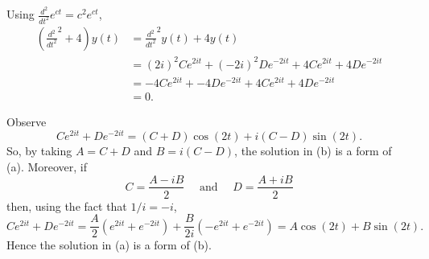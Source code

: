 \documentclass{homework}
\begin{document}

Using $\frac{d^2}{dt^2} e^{ct} = c^2e^{ct}$,
\begin{align*}
  \left(\frac {d^2}{dt^2}^2 + 4\right)y(t) 
  &= \frac {d^2}{dt^2}^2 y(t) + 4y(t)\\
  &= (2i)^2 C e^{2it} + (-2i)^2 De^{-2it} + 4C e^{2it} + 4De^{-2it} \\
  &= -4C e^{2it} + -4De^{-2it} + 4C e^{2it} + 4De^{-2it} \\
  &=0.
\end{align*}

Observe
$$
  Ce^{2it} + De^{-2it} = (C+D)\cos(2t) + i(C-D)\sin(2t).
$$
So, by taking $A = C+D$ and $B = i(C-D)$, the solution in (b) is a form of (a).  Moreover, if 
$$
  C = \frac{A-iB}{2}\quad \text{ and }\quad D = \frac{A + iB}{2} 
$$
then, using the fact that $1/i = -i$, 
$$
  Ce^{2it} + De^{-2it} = \frac A2(e^{2it} + e^{-2it}) + \frac{B}{2i}(-e^{2it} + e^{-2it}) = A\cos(2t) + B\sin(2t).
$$
Hence the solution in (a) is a form of (b).
%


\end{document}
